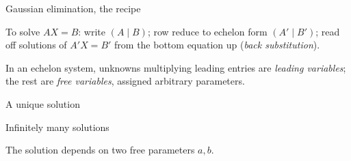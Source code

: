 \begin{frame}{Gaussian elimination, the recipe}
\begin{theorem}
To solve $AX=B$: write $(A\mid B)$; row reduce to echelon form $(A'\mid B')$; read off solutions of
$A'X=B'$ from the bottom equation up (\emph{back substitution}).
\end{theorem}

\pause

\begin{definition}
In an echelon system, unknowns multiplying leading entries are \emph{leading variables}; the rest are
\emph{free variables}, assigned arbitrary parameters.
\end{definition}
\end{frame}

\begin{frame}{A unique solution}
\begin{steps}
\end{steps}
\end{frame}

\begin{frame}{Infinitely many solutions}
\begin{steps}
\end{steps}

\pause

The solution depends on two free parameters $a,b$.
\end{frame}


